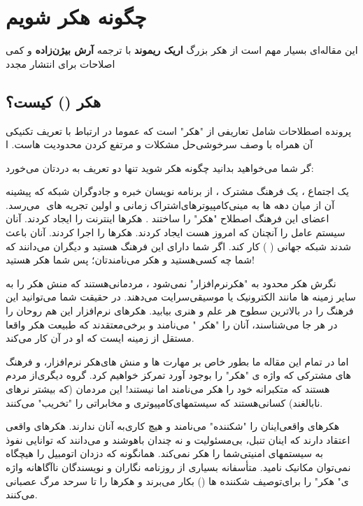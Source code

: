 \section{چگونه هکر شویم}
\begin{mybox}
این مقاله‌ای بسیار مهم است از هکر بزرگ
\textbf{اریک ریموند}
با ترجمه
\textbf{آرش بیژن‌زاده}
و کمی اصلاحات برای انتشار مجدد
\end{mybox}

\subsection*{هکر () کیست؟}
پرونده اصطلاحات
 شامل تعاریفی‌ از "هکر" است که عموما در ارتباط با تعریف تکنیکی‌ آن همراه با وصف سرخوشی‌حل مشکلات و مرتفع کردن محدودیت هاست. ا
 
 گر شما می‌خواهید بدانید چگونه هکر شوید تنها دو تعریف به دردتان می‌خورد:

یک اجتماع ، یک فرهنگ مشترک ، از برنامه نویسان خبره و جادوگران شبکه که پیشینه آن از میان دهه ها به مینی‌کامپیوترهای‌اشتراک زمانی
و اولین تجریه های ‌
 می‌رسد. اعضای این فرهنگ اصطلاح "هکر" را ساختند . هکرها اینترنت را ایجاد کردند. آنان سیستم عامل
 را آنچنان که امروز هست ایجاد کردند. هکرها 
 را اجرا کردند. آنان باعث شدند شبکه جهانی (
) کار کند.
 اگر شما دارای این فرهنگ هستید و دیگران می‌دانند که شما چه کسی‌هستید و هکر می‌نامندتان؛ پس شما هکر هستید!
 
نگرش هکر محدود به "هکرنرم‌افزار" نمی‌شود ، مردمانی‌هستند که منش هکر را به سایر زمینه ها مانند الکترونیک یا موسیقی‌سرایت می‌دهند. در حقیقت شما می‌توانید این فرهنگ را در بالاترین سطوح هر علم و هنری بیابید. هکرهای نرم‌افزار این هم روحان را در هر جا می‌شناسند، آنان را "هکر " می‌نامند و برخی‌معتقدند که طبیعت هکر واقعا مستقل از زمینه ایست که او در آن کار می‌کند. 

اما در تمام این مقاله ما بطور خاص بر مهارت ها و منش های‌هکر نرم‌افزار، و فرهنگ های مشترکی که واژه ی "هکر" را بوجود آورد تمرکز خواهیم کرد.
گروه دیگری‌از مردم هستند که متکبرانه خود را هکر می‌نامند اما نیستند! این مردمان (که بیشتر نرهای نابالغند) کسانی‌هستند که سیستمهای‌کامپیوتری و مخابراتی را "تخریب" می‌کنند.

 هکرهای واقعی‌اینان را "شکننده" می‌نامند و هیچ کاری‌به آنان ندارند. هکرهای واقعی اعتقاد دارند که اینان تنبل، بی‌مسئولیت و نه چندان باهوشند و می‌دانند که توانایی نفوذ به سیستمهای امنیتی‌شما را هکر نمی‌کند. همانگونه که دزدان اتومبیل را هیچگاه نمی‌توان مکانیک نامید. متأسفانه بسیاری از روزنامه نگاران و نویسندگان ناآگاهانه وا‌ژه ی" هکر" را برای‌توصیف شکننده ها () بکار می‌برند و هکرها را تا سرحد مرگ عصبانی می‌کنند.

